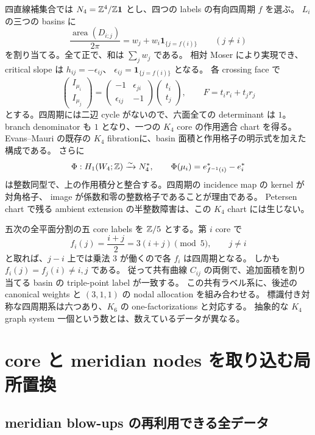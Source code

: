 \documentclass[11pt,a4paper]{article}
\begin{document}
四直線補集合では $N_4=\mathbb Z^4/\mathbb Z\mathbf1$ とし、四つの labels の有向四周期 $f$ を選ぶ。
$L_i$ の三つの basins に
\[
 \frac{\operatorname{area}(D_{i;j})}{2\pi}
 =w_j+w_i\mathbf1_{\{j=f(i)\}}\qquad(j\ne i)
\]
を割り当てる。全て正で、和は $\sum_jw_j$ である。
相対 Moser により実現でき、critical slope は $h_{ij}=-\epsilon_{ij}$、
$\epsilon_{ij}=\mathbf1_{\{j=f(i)\}}$ となる。
各 crossing face で
\[
 \begin{pmatrix}I_{\mu_i}\\I_{\mu_j}\end{pmatrix}
 =\begin{pmatrix}-1&\epsilon_{ji}\\\epsilon_{ij}&-1\end{pmatrix}
   \begin{pmatrix}t_i\\t_j\end{pmatrix},
 \qquad F=t_ir_i+t_jr_j
\]
とする。四周期には二辺 cycle がないので、六面全ての determinant は $1$。
branch denominator も $1$ となり、一つの $K_4$ core の作用適合 chart を得る。
Evans--Mauri の既存の $K_4$ fibration\cite{EM}に、basin 面積と作用格子の明示式を加えた構成である。
さらに
\[
 \Phi:H_1(W_4;\mathbb Z)\xrightarrow{\sim}N_4^*,\qquad
 \Phi(\mu_i)=e^*_{f^{-1}(i)}-e_i^*
\]
は整数同型で、上の作用積分と整合する。四周期の incidence map の kernel が対角格子、
image が係数和零の整数格子であることが理由である。
Petersen chart で残る ambient extension の半整数障害は、この $K_4$ chart には生じない。

五次の全平面分割の五 core labels を $\mathbb Z/5$ とする。第 $i$ core で
\[
 f_i(j)=\frac{i+j}{2}=3(i+j)\pmod5,\qquad j\ne i
\]
と取れば、$j-i$ 上では乗法 $3$ が働くので各 $f_i$ は四周期となる。
しかも $f_i(j)=f_j(i)\ne i,j$ である。
従って共有曲線 $C_{ij}$ の両側で、追加面積を割り当てる basin の triple-point label が一致する。
この共有ラベル系に、後述の canonical weights と $(3,1,1)$ の nodal allocation を組み合わせる。
標識付き対称な四周期系は六つあり、$K_6$ の one-factorizations と対応する。
抽象的な $K_4$ graph system 一個という数とは、数えているデータが異なる。




\section{core と meridian nodes を取り込む局所置換}

\subsection{meridian blow-ups の再利用できる全データ}
\end{document}
